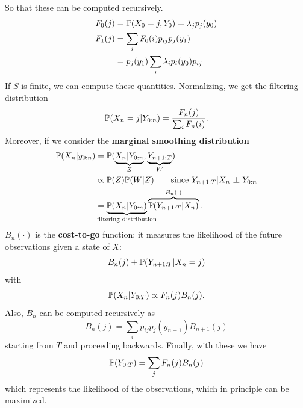 \documentclass{article}
\begin{document}
So that these can be computed recursively.
\begin{align*}
    F_0(j)&=\mathbb{P}(X_0=j,Y_0)=\lambda_jp_j(y_0)\\
    F_1(j)&=\sum_i F_0(i)p_{ij}p_j(y_1)\\
    &=p_j(y_1)\sum_i\lambda_i p_i(y_0)p_{ij}
\end{align*}
If $S$ is finite, we can compute these quantities. Normalizing, we get the filtering distribution
\[
\mathbb{P}(X_n=j|Y_{0:n})=\frac{F_n(j)}{\sum_i F_n(i)}.
\]
Moreover, if we consider the \textbf{marginal smoothing distribution}
\begin{align*}
    \prob(X_n|y_{0:n})&=\prob(\underbrace{X_n|Y_{0:n}}_{Z},\underbrace{Y_{n+1:T}}_{W})\\
    &\propto\prob(Z)\prob(W|Z)\qquad\text{since }Y_{n+1:T}|X_n \independent Y_{0:n}\\
    &=\underbrace{\prob(X_n|Y_{0:n})}_{\mathclap{\text{filtering distribution}}}\overbrace{\prob(Y_{n+1:T}|X_n)}^{\mathclap{B_n(\cdot)}}.
\end{align*}
$B_n(\cdot)$ is the \textbf{cost-to-go} function: it measures the likelihood of the future observations given a state of $X$:
\[B_n(j)+\mathbb{P}(Y_{n+1:T}|X_n=j)\]
with
\[
\mathbb{P}(X_n|Y_{0:T})\propto F_n(j)B_n(j).
\]
Also, $B_n$ can be computed recursively as
\[B_n(j)=\sum_i p_{ij}p_{j}(y_{n+1})B_{n+1}(j)\]
starting from $T$ and proceeding backwards. Finally, with these we have
\[
\mathbb{P}(Y_{0:T})=\sum_jF_n(j)B_n(j)
\]
which represents the likelihood of the observations, which in principle can be maximized.
\end{document}
